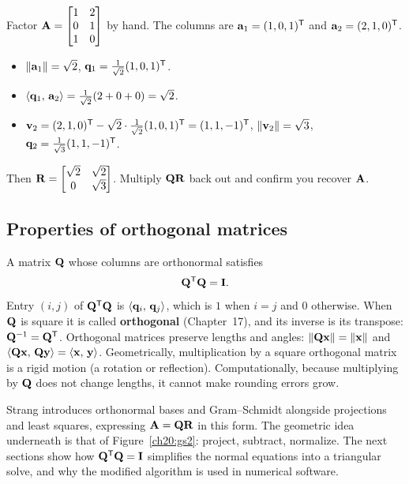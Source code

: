 \begin{labbox}
Factor $\mathbf{A}=\begin{bmatrix}1&2\\0&1\\1&0\end{bmatrix}$ by hand. The columns are
$\mathbf{a}_1=(1,0,1)^{\mathsf{T}}$ and $\mathbf{a}_2=(2,1,0)^{\mathsf{T}}$.
\begin{itemize}
  \item $\lVert\mathbf{a}_1\rVert=\sqrt2$, $\mathbf{q}_1=\tfrac{1}{\sqrt2}(1,0,1)^{\mathsf{T}}$.
  \item $\langle \mathbf{q}_1,\, \mathbf{a}_2 \rangle=\tfrac{1}{\sqrt2}(2+0+0)=\sqrt2$.
  \item $\mathbf{v}_2=(2,1,0)^{\mathsf{T}}-\sqrt2\cdot\tfrac{1}{\sqrt2}(1,0,1)^{\mathsf{T}}=(1,1,-1)^{\mathsf{T}}$,
        $\lVert\mathbf{v}_2\rVert=\sqrt3$, $\mathbf{q}_2=\tfrac{1}{\sqrt3}(1,1,-1)^{\mathsf{T}}$.
\end{itemize}
Then $\mathbf{R}=\begin{bmatrix}\sqrt2 & \sqrt2\\ 0 & \sqrt3\end{bmatrix}$. Multiply
$\mathbf{Q}\mathbf{R}$ back out and confirm you recover $\mathbf{A}$.
\end{labbox}

\subsection{Properties of orthogonal matrices}

A matrix $\mathbf{Q}$ whose columns are orthonormal satisfies
\[
  \mathbf{Q}^{\mathsf{T}}\mathbf{Q} = \mathbf{I}.
\]
Entry $(i,j)$ of $\mathbf{Q}^{\mathsf{T}}\mathbf{Q}$ is $\langle \mathbf{q}_i,\, \mathbf{q}_j \rangle$, which is $1$ when
$i=j$ and $0$ otherwise. When $\mathbf{Q}$ is square it is called \textbf{orthogonal}
(Chapter~17), and its inverse is its transpose: $\mathbf{Q}^{-1}=\mathbf{Q}^{\mathsf{T}}$.
Orthogonal matrices preserve lengths and angles: $\lVert\mathbf{Q}\mathbf{x}\rVert=\lVert\mathbf{x}\rVert$
and $\langle \mathbf{Q}\mathbf{x},\, \mathbf{Q}\mathbf{y} \rangle=\langle \mathbf{x},\, \mathbf{y} \rangle$. Geometrically,
multiplication by a square orthogonal matrix is a rigid motion (a rotation or
reflection). Computationally, because multiplying by $\mathbf{Q}$ does not change lengths,
it cannot make rounding errors grow.

\begin{strangbox}
Strang introduces orthonormal bases and Gram--Schmidt alongside projections and
least squares, expressing $\mathbf{A}=\mathbf{Q}\mathbf{R}$ in this form. The geometric idea
underneath is that of Figure~\ref{ch20:gs2}: project, subtract, normalize. The next
sections show how $\mathbf{Q}^{\mathsf{T}}\mathbf{Q}=\mathbf{I}$ simplifies the normal equations into a
triangular solve, and why the modified algorithm is used in numerical software.
\end{strangbox}

